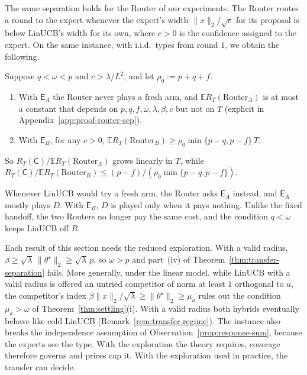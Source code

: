 \documentclass[anon]{alt2027} %
\newif\ifrevmarks\revmarkstrue
\newenvironment{revised}{\ifrevmarks\color{revcolor}\fi}{}
\newcommand{\E}{\mathbb{E}}
\newcommand{\Cold}{\mathsf{C}}
\newcommand{\Exp}{\mathsf{E}}
\begin{document}
\begin{revised}
The same separation holds for the Router of our experiments. The Router
routes a round to the expert whenever the expert's width $\|x\|_2/\sqrt c$
for its proposal is below LinUCB's width for its own, where $c>0$ is the
confidence assigned to the expert. On the same instance, with i.i.d.\ types
from round $1$, we obtain the following.
\end{revised}

\begin{proposition}
\label{prop:router-sep}
Suppose $q<\omega<p$ and $c>\lambda/L^2$, and let $\rho_0:=p+q+f$.
\begin{enumerate}[itemsep=1pt,topsep=1pt,leftmargin=*]
\item[(i)] With
$\Exp_A$ the Router never plays a fresh arm, and $\E R_T(\mathrm{Router}_A)$
is at most a constant that depends on $p,q,f,\omega,\lambda,\beta,c$ but not
on $T$ (explicit in Appendix~\ref{app:proof-router-sep}).
\item[(ii)] With $\Exp_B$,
for any $c>0$, $\E R_T(\mathrm{Router}_B)\ge\rho_0\min\{p-q,p-f\}\,T$.
\end{enumerate}
So
$R_T(\Cold)/\E R_T(\mathrm{Router}_A)$ grows linearly in $T$, while
$R_T(\Cold)/\E R_T(\mathrm{Router}_B)\le(p-f)/(\rho_0\min\{p-q,p-f\})$.
\end{proposition}

\begin{revised}
Whenever LinUCB would try a fresh arm, the Router asks $\Exp_A$ instead, and
$\Exp_A$ mostly plays $D$. With $\Exp_B$, $D$ is played only when it pays
nothing. Unlike the fixed handoff, the two Routers no longer pay the same
cost, and the condition $q<\omega$ keeps LinUCB off $R$.
\end{revised}

\begin{revised}
Each result of this section needs the reduced exploration. With a valid
radius, $\beta\ge\sqrt\lambda\,\|\theta^\star\|_2\ge\sqrt\lambda\,p$, so
$\omega>p$ and part~(iv) of Theorem~\ref{thm:transfer-separation} fails.
More generally, under the linear model, while LinUCB with a valid radius is
offered an untried competitor of norm at least $1$ orthogonal to $u$, the
competitor's index $\beta\|x\|_2/\sqrt\lambda\ge\|\theta^\star\|_2\ge\mu_a$
rules out the condition $\mu_a>\omega$ of Theorem~\ref{thm:settling}(i).
With a valid radius both hybrids eventually behave like cold LinUCB
(Remark~\ref{rem:transfer-regime}). The instance also breaks the
independence assumption of Observation~\ref{prop:response-sum}, because the
experts see the type. With the exploration the theory requires, coverage
therefore governs and prices cap it. With the exploration used in practice,
the transfer can decide.
\end{revised}
\end{document}
